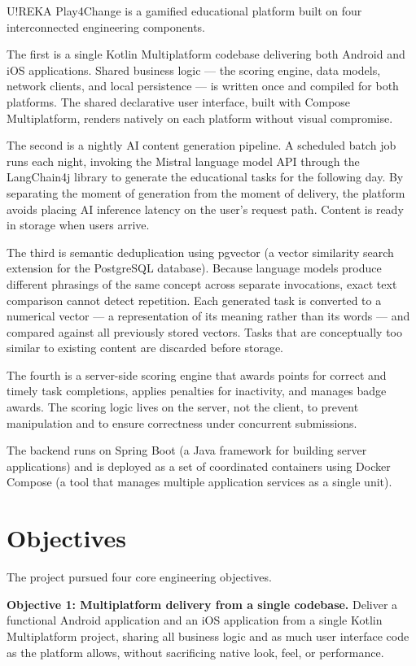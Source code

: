 U!REKA Play4Change is a gamified educational platform built on four interconnected engineering components.

The first is a single Kotlin Multiplatform codebase delivering both Android and iOS applications. Shared business logic --- the scoring engine, data models, network clients, and local persistence --- is written once and compiled for both platforms. The shared declarative user interface, built with Compose Multiplatform, renders natively on each platform without visual compromise.

The second is a nightly AI content generation pipeline. A scheduled batch job runs each night, invoking the Mistral language model API through the LangChain4j library to generate the educational tasks for the following day. By separating the moment of generation from the moment of delivery, the platform avoids placing AI inference latency on the user's request path. Content is ready in storage when users arrive.

The third is semantic deduplication using pgvector (a vector similarity search extension for the PostgreSQL database). Because language models produce different phrasings of the same concept across separate invocations, exact text comparison cannot detect repetition. Each generated task is converted to a numerical vector --- a representation of its meaning rather than its words --- and compared against all previously stored vectors. Tasks that are conceptually too similar to existing content are discarded before storage.

The fourth is a server-side scoring engine that awards points for correct and timely task completions, applies penalties for inactivity, and manages badge awards. The scoring logic lives on the server, not the client, to prevent manipulation and to ensure correctness under concurrent submissions.

The backend runs on Spring Boot (a Java framework for building server applications) and is deployed as a set of coordinated containers using Docker Compose (a tool that manages multiple application services as a single unit).

\section{Objectives}

The project pursued four core engineering objectives.

\textbf{Objective 1: Multiplatform delivery from a single codebase.} Deliver a functional Android application and an iOS application from a single Kotlin Multiplatform project, sharing all business logic and as much user interface code as the platform allows, without sacrificing native look, feel, or performance.

